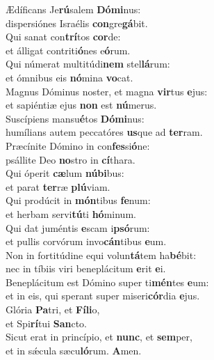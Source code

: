 \evenverse Ædíficans Je\textbf{rú}salem \textbf{Dó}\textbf{mi}nus:~\*\\
\evenverse dispersiónes Israélis \textbf{con}gre\textbf{gá}bit.\\
\oddverse Qui sanat con\textbf{trí}tos \textbf{cor}de:~\*\\
\oddverse et álligat contriti\textbf{ó}nes e\textbf{ó}rum.\\
\evenverse Qui númerat multitúdi\textbf{nem} stel\textbf{lá}rum:~\*\\
\evenverse et ómnibus eis \textbf{nó}mina \textbf{vo}cat.\\
\oddverse Magnus Dóminus noster, et magna \textbf{vir}tus \textbf{e}jus:~\*\\
\oddverse et sapiéntiæ ejus \textbf{non} est \textbf{nú}merus.\\
\evenverse Suscípiens mansu\textbf{é}tos \textbf{Dó}\textbf{mi}nus:~\*\\
\evenverse humílians autem peccatóres \textbf{us}que ad \textbf{ter}ram.\\
\oddverse Præcínite Dómino in con\textbf{fes}si\textbf{ó}ne:~\*\\
\oddverse psállite Deo \textbf{no}stro in \textbf{cí}thara.\\
\evenverse Qui óperit \textbf{cæ}lum \textbf{nú}\textbf{bi}bus:~\*\\
\evenverse et parat \textbf{ter}ræ \textbf{plú}viam.\\
\oddverse Qui prodúcit in \textbf{món}tibus \textbf{fe}num:~\*\\
\oddverse et herbam servi\textbf{tú}ti \textbf{hó}minum.\\
\evenverse Qui dat juméntis \textbf{e}scam i\textbf{psó}rum:~\*\\
\evenverse et pullis corvórum invo\textbf{cán}tibus \textbf{e}um.\\
\oddverse Non in fortitúdine equi volun\textbf{tá}tem ha\textbf{bé}bit:~\*\\
\oddverse nec in tíbiis viri beneplácitum \textbf{e}rit \textbf{e}i.\\
\evenverse Beneplácitum est Dómino super ti\textbf{mén}tes \textbf{e}um:~\*\\
\evenverse et in eis, qui sperant super miseri\textbf{cór}dia \textbf{e}jus.\\
\oddverse Glória \textbf{Pa}tri, et \textbf{Fí}\textbf{li}o,~\*\\
\oddverse et Spi\textbf{rí}tui \textbf{San}cto.\\
\evenverse Sicut erat in princípio, et \textbf{nunc}, et \textbf{sem}per,~\*\\
\evenverse et in sǽcula sæcu\textbf{ló}rum. \textbf{A}men.\\
